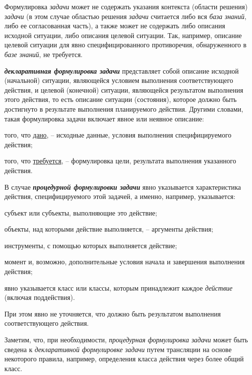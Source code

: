 Формулировка \textit{задачи} может не содержать указания контекста (области решения) \textit{задачи} (в этом случае областью решения \textit{задачи} считается либо вся \textit{база знаний}, либо ее согласованная часть), а также может не содержать либо описания исходной ситуации, либо описания целевой ситуации. Так, например, описание целевой ситуации для явно специфицированного противоречия, обнаруженного в \textit{базе знаний}, не требуется.

\textbf{\textit{декларативная формулировка задачи}} представляет собой описание исходной (начальной) ситуации, являющейся условием выполнения соответствующего действия, и целевой (конечной) ситуации, являющейся результатом выполнения этого действия, то есть
описание ситуации (состояния), которое должно быть достигнуто в результате выполнения планируемого действия. Другими словами, такая формулировка задачи включает явное или неявное описание:
\begin{textitemize}
	\item того, что \underline{дано}, -- исходные данные, условия выполнения специфицируемого действия;
	\item того, что \underline{требуется}, -- формулировка цели, результата выполнения указанного действия.
\end{textitemize}

В случае \textbf{\textit{процедурной формулировки задачи}} явно указывается характеристика действия, специфицируемого этой задачей, а именно, например, указывается:
\begin{textitemize}
	\item субъект или субъекты, выполняющие это действие;
	\item объекты, над которыми действие выполняется, -- аргументы действия;
	\item инструменты, с помощью которых выполняется действие;
	\item момент и, возможно, дополнительные условия начала и завершения выполнения действия;
	\item явно указывается класс или классы, которым принадлежит каждое \textit{действие} (включая поддействия).
\end{textitemize}

При этом явно не уточняется, что должно быть результатом выполнения соответствующего действия.

Заметим, что, при необходимости, \textit{процедурная формулировка задачи} может быть сведена к \textit{декларативной формулировке задачи} путем трансляции на основе некоторого правила, например, определения класса действия через более общий класс.

